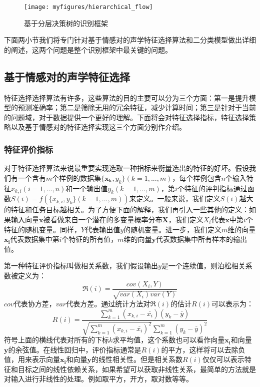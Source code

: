 \begin{figure}[htb] %
    \centering
    \texttt{[image: myfigures/hierarchical\_flow]}
    \caption{基于分层决策树的识别框架}
    \label{fig:hierarchical_flow}
\end{figure}

下面两小节我们将专门针对基于情感对的声学特征选择算法和二分类模型做出详细的阐述，这两个问题是整个识别框架中最关键的问题。

\subsection{基于情感对的声学特征选择}
\label{ssec:emo_pair_feature_select}
特征选择选择算法有许多，这些算法的目的主要可以分为三个方面：第一是提升模型的预测准确率；第二是筛除无用的冗余特征，减少计算时间；第三是针对于当前的问题域，对于数据提供一个更好的理解。下面将会对特征选择指标，特征选择策略以及基于情感对的特征选择实现这三个方面分别作介绍。

\subsubsection{特征评价指标}
\label{sssec:feature_select_metrics}
对于特征选择算法来说最重要实现选取一种指标来衡量选出的特征的好坏。假设我们有一个含有$m$个样例的数据集$\{\mathbf{x_k}, y_k\}(k=1,...,m)$，每个样例包含$n$个输入特征$x_{k,i}(i=1,...,n)$和一个输出值$y_k(k=1,...,m)$，第$i$个特征的评判指标通过函数$S(i)=f(\{x_{k,i}, y_k\}(k=1,...,m))$来定义。一般来说，我们定义$S(i)$越大的特征和任务目标越相关。为了方便下面的解释，我们再引入一些其他的定义：如果输入向量$\mathbf{x}$被看做来自一个潜在的多变量概率分布$\mathbf{X}$，我们定义$X_i$代表$\mathbf{x}$中第$i$个特征的随机变量。同样，$Y$代表输出值$y$的随机变量。进一步，我们定义$m$维的向量$\mathbf{x_i}$代表数据集中第$i$个特征的所有值，$m$维的向量$\mathbf{y}$代表数据集中所有样本的输出值。

第一种特征评价指标叫做相关系数，我们假设输出$y$是一个连续值，则泊松相关系数被定义为：
\begin{equation}
\label{equ:pearson_cc}
    \Re(i) = \frac{cov(X_i, Y)}{\sqrt{var(X_i)var(Y)}}
\end{equation}
$cov$代表协方差，$var$代表方差。通过统计方法对$\Re(i)$的估计$R(i)$可以表示为：
\begin{equation}
\label{equ:pearson_cc_real}
    R(i) = \frac{\sum_{k=1}^{m}(x_{k,i} - \overline{x_i})(y_k - \overline{y})}{\sqrt{\sum_{k=1}^{m}(x_{k,i} - \overline{x_i})^2}\sum_{k=1}^{m}(y_k - \overline{y})^2}
\end{equation}
符号上面的横线代表对所有的下标$k$求平均值，这个系数也可以看作向量$\mathbf{x_i}$和向量$\mathbf{y}$的余弦值。在线性回归中，评价指标通常是$R(i)$的平方，这样将可以去除负值，用来表示向量$\mathbf{x_i}$和向量$\mathbf{y}$的线性相关性。但是相关系数$R(i)$仅仅可以表示特征和目标之间的线性依赖关系，如果希望可以获取非线性关系，最简单的方法就是对输入进行非线性的处理。例如取平方，开方，取对数等等。

